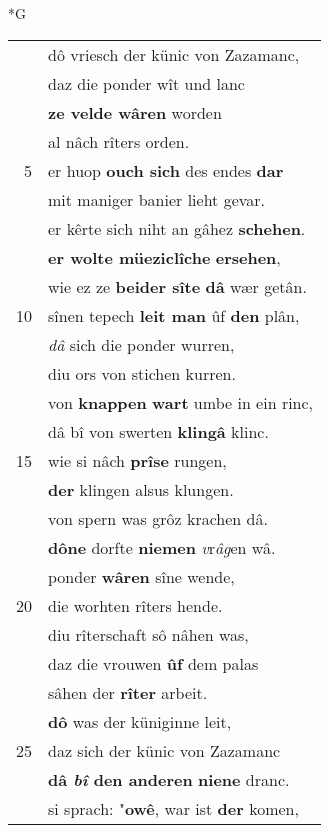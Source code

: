 \documentclass[8pt,a4paper,notitlepage]{article}
\begin{document}
\newpage
\begin{table}[ht]
\begin{minipage}[t]{0.5\linewidth}
\small
\begin{center}*G
\end{center}
\begin{tabular}{rl}
 & dô vriesch der künic von Zazamanc,\\ 
 & daz die ponder wît und lanc\\ 
 & \textbf{ze velde wâren} worden\\ 
 & al nâch rîters orden.\\ 
5 & er huop \textbf{ouch sich} des endes \textbf{dar}\\ 
 & mit maniger banier lieht gevar.\\ 
 & er kêrte sich niht an gâhez \textbf{schehen}.\\ 
 & \textbf{er wolte müeziclîche} \textbf{ersehen},\\ 
 & wie ez ze \textbf{beider sîte} \textbf{dâ} wær getân.\\ 
10 & sînen tepech \textbf{leit man} ûf \textbf{den} plân,\\ 
 & \textit{dâ} sich die ponder wurren,\\ 
 & diu ors von stichen kurren.\\ 
 & von \textbf{knappen} \textbf{wart} umbe in ein rinc,\\ 
 & dâ bî von swerten \textbf{klingâ} klinc.\\ 
15 & wie si nâch \textbf{prîse} rungen,\\ 
 & \textbf{der} klingen alsus klungen.\\ 
 & von spern was grôz krachen dâ.\\ 
 & \textbf{dô}\textbf{ne} dorfte \textbf{niemen} \textit{v}r\textit{âg}en wâ.\\ 
 & ponder \textbf{wâren} sîne wende,\\ 
20 & die worhten rîters hende.\\ 
 & diu rîterschaft sô nâhen was,\\ 
 & daz die vrouwen \textbf{ûf} dem palas\\ 
 & sâhen der \textbf{rîter} arbeit.\\ 
 & \textbf{dô} was der küniginne leit,\\ 
25 & daz sich der künic von Zazamanc\\ 
 & \textbf{dâ \textit{bî} den anderen} \textbf{niene} dranc.\\ 
 & si sprach: "\textbf{owê}, war ist \textbf{der} komen,\\ 

\end{tabular}
\end{minipage}
\end{table}
\end{document}
